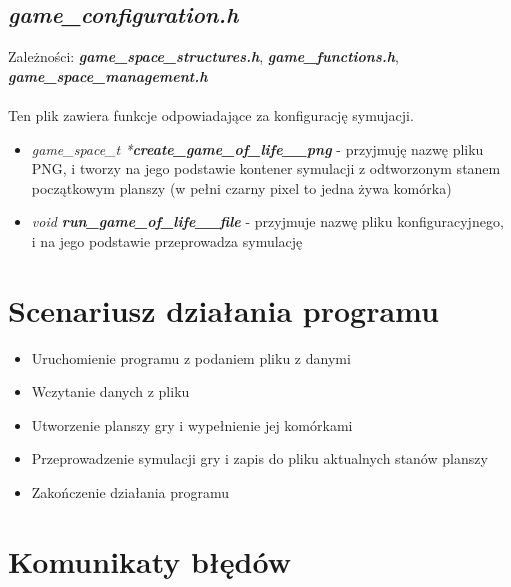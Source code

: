 \documentclass[12pt]{article}
\begin{document}
    \subsection{\textbf{\textit{game\_configuration.h}}}
        Zależności: \textit{ \textbf{game\_space\_structures.h}}, \textbf{\textit{game\_functions.h}}, \textbf{\textit{game\_space\_management.h}}\\\\
        Ten plik zawiera funkcje odpowiadające za konfigurację symujacji.

        \begin{itemize}
            \item \textit{game\_space\_t *\textbf{create\_game\_of\_life\_\_png}} - przyjmuję nazwę pliku PNG, i tworzy na jego podstawie kontener symulacji z odtworzonym stanem początkowym planszy (w pełni czarny pixel to jedna żywa komórka)
            \item \textit{void \textbf{run\_game\_of\_life\_\_file}} - przyjmuje nazwę pliku konfiguracyjnego, i na jego podstawie przeprowadza symulację
        \end{itemize}
        
\section{Scenariusz działania programu}

\begin{itemize}
	        \item Uruchomienie programu z podaniem pliku z danymi
	        \item Wczytanie danych z pliku
	        \item Utworzenie planszy gry i wypełnienie jej komórkami
	        \item Przeprowadzenie symulacji gry i zapis do pliku aktualnych stanów planszy
	        \item Zakończenie działania programu
\end{itemize}

\section{Komunikaty błędów}
\end{document}

